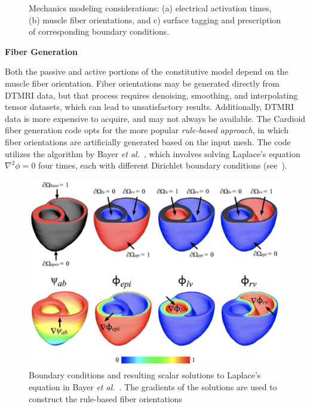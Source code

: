 \begin{figure}
{\label{fig:supp3}}
%
\caption{Mechanics modeling considerations: (a) electrical activation times, (b) muscle fiber orientations, and c) surface tagging and prescription of corresponding boundary conditions.}
\label{fig:supp}
\end{figure}

\textbf{Fiber Generation}

Both the passive and active portions of the constitutive model depend on the muscle fiber orientation. Fiber orientations may be generated directly from DTMRI data, but that process requires denoising, smoothing, and interpolating tensor datasets, which can lead to unsatisfactory results. Additionally, DTMRI data is more expensive to acquire, and may not always be available. The Cardioid fiber generation code opts for the more popular \textit{rule-based approach}, in which fiber orientations are artificially generated based on the input mesh. The code utilizes the algorithm by Bayer \textit{et al.}~\cite{bayer_2012}, which involves solving Laplace's equation $\nabla^2\phi = 0$ four times, each with different Dirichlet boundary conditions (see~).

\begin{figure}[ht]
\centering
		\includegraphics[scale=0.3]{media/bayer.png}
\caption{Boundary conditions and resulting scalar solutions to Laplace's equation in Bayer \textit{et al.}~\cite{bayer_2012}. The gradients of the solutions are used to construct the rule-based fiber orientations}
\label{fig:bayer}
\end{figure}

